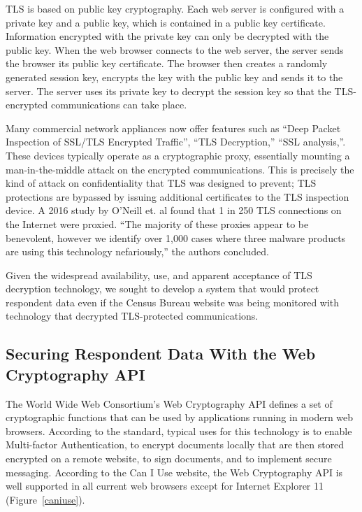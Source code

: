 \documentclass[fleqn,10pt]{wlscirep}
\begin{document}
TLS is based on public key cryptography. Each web server is configured
with a private key and a public key, which is contained in a public
key certificate. Information encrypted with the private key can only
be decrypted with the public key. When the web browser connects to the
web server, the server sends the browser its public key
certificate. The browser then creates a randomly generated session
key, encrypts the key with the public key and sends it to the
server. The server uses its private key to decrypt the session key so
that the TLS-encrypted communications can take place.

Many commercial network appliances now offer features such as ``Deep
Packet Inspection of SSL/TLS Encrypted
Traffic''\cite{sonicwall}, ``TLS Decryption,''\cite{paloalto} ``SSL
analysis,''\cite{globalsign}. These devices typically operate as a
cryptographic proxy, essentially mounting a man-in-the-middle attack
on the encrypted communications. This is precisely the kind of attack
on confidentiality that TLS was designed to prevent; TLS protections
are bypassed by issuing additional certificates to the TLS inspection
device. A 2016 study by O'Neill et. al found that 1 in 250 TLS
connections on the Internet were proxied. ``The majority of these proxies appear to be benevolent,
however we identify over 1,000 cases where three malware
products are using this technology nefariously,'' the authors concluded.\cite{DBLP:conf/imc/ONeillRSZ16}

Given the widespread availability, use, and apparent acceptance of TLS
decryption technology, we sought to develop a system that would
protect respondent data even if the Census Bureau website was being
monitored with technology that decrypted TLS-protected communications. 
 
\subsection{Securing Respondent Data With the Web Cryptography API}

The World Wide Web Consortium's Web Cryptography API\cite{wcapi}
defines a set of cryptographic functions that can be used by
applications running in modern web browsers. According to the
standard, typical uses for this technology is to enable Multi-factor
Authentication, to encrypt documents locally that are then stored
encrypted on a remote website, to sign documents, and to implement
secure messaging. According to the Can I Use website, the Web
Cryptography API is well supported in all current web browsers except
for Internet Explorer 11 (Figure~\ref{caniuse}).
\end{document}
